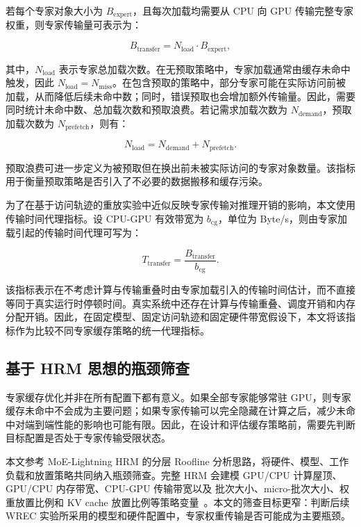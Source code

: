 若每个专家对象大小为 $B_{\mathrm{expert}}$，且每次加载均需要从 CPU 向 GPU 传输完整专家权重，则专家传输量可表示为：

\begin{equation}
    \label{equ:transfer-bytes}
    B_{\mathrm{transfer}}=N_{\mathrm{load}}\cdot B_{\mathrm{expert}},
\end{equation}

其中，$N_{\mathrm{load}}$ 表示专家总加载次数。在无预取策略中，专家加载通常由缓存未命中触发，因此 $N_{\mathrm{load}}=N_{\mathrm{miss}}$。在包含预取的策略中，部分专家可能在实际访问前被加载，从而降低后续未命中数；同时，错误预取也会增加额外传输量。因此，需要同时统计未命中数、总加载次数和预取浪费。若记需求加载次数为 $N_{\mathrm{demand}}$，预取加载次数为 $N_{\mathrm{prefetch}}$，则有：

\begin{equation}
    \label{equ:load-count}
    N_{\mathrm{load}}=N_{\mathrm{demand}}+N_{\mathrm{prefetch}}.
\end{equation}

预取浪费可进一步定义为被预取但在换出前未被实际访问的专家对象数量。该指标用于衡量预取策略是否引入了不必要的数据搬移和缓存污染。

为了在基于访问轨迹的重放实验中近似反映专家传输对推理开销的影响，本文使用传输时间代理指标。设 CPU-GPU 有效带宽为 $b_{\mathrm{cg}}$，单位为 Byte/s，则由专家加载引起的传输时间代理可写为：

\begin{equation}
    \label{equ:transfer-time-proxy}
    T_{\mathrm{transfer}}=\frac{B_{\mathrm{transfer}}}{b_{\mathrm{cg}}}.
\end{equation}

该指标表示在不考虑计算与传输重叠时由专家加载引入的传输时间估计，而不直接等同于真实运行时停顿时间。真实系统中还存在计算与传输重叠、调度开销和内存分配开销。因此，在固定模型、固定访问轨迹和固定硬件带宽假设下，本文将该指标作为比较不同专家缓存策略的统一代理指标。

\subsection{基于 HRM 思想的瓶颈筛查}

专家缓存优化并非在所有配置下都有意义。如果全部专家能够常驻 GPU，则专家缓存未命中不会成为主要问题；如果专家传输可以完全隐藏在计算之后，减少未命中对端到端性能的影响也可能有限。因此，在设计和评估缓存策略前，需要先判断目标配置是否处于专家传输受限状态。

本文参考 MoE-Lightning HRM 的分层 Roofline 分析思路，将硬件、模型、工作负载和放置策略共同纳入瓶颈筛查。完整 HRM 会建模 GPU/CPU 计算屋顶、GPU/CPU 内存带宽、CPU-GPU 传输带宽以及 批次大小、micro-批次大小、权重放置比例和 KV cache 放置比例等策略变量~\cite{cao2025moelightning}。本文的筛查目标更窄：判断后续 WREC 实验所采用的模型和硬件配置中，专家权重传输是否可能成为主要瓶颈。

